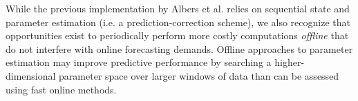 \documentclass[10pt,letterpaper]{article}
\begin{document}
While the previous implementation by Albers et al. relies on sequential state and parameter estimation (i.e. a prediction-correction scheme), we also recognize that opportunities exist to periodically perform more costly computations \emph{offline} that do not interfere with online forecasting demands. Offline approaches to parameter estimation may improve predictive performance by searching a higher-dimensional parameter space over larger windows of data than can be assessed using fast online methods.





\end{document}
